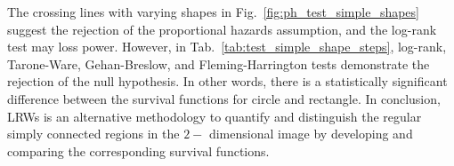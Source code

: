 The crossing lines with varying shapes in
Fig.~\ref{fig:ph_test_simple_shapes} suggest the rejection of the
proportional hazards assumption, and the log-rank test may loss
power. However, in Tab.~\ref{tab:test_simple_shape_steps}, log-rank,
Tarone-Ware, Gehan-Breslow, and Fleming-Harrington tests demonstrate
the rejection of the null hypothesis. In other words, there is a
statistically significant difference between the survival functions
for circle and rectangle. In conclusion, LRWs is an alternative
methodology to quantify and distinguish the regular simply connected
regions in the $2-$ dimensional image by developing and comparing the
corresponding survival functions.


  

